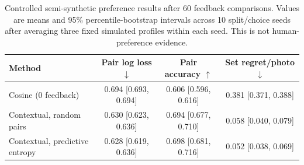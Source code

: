 \begin{table}[t]
\centering
\small
\caption{Controlled semi-synthetic preference results after 60 feedback comparisons. Values are means and 95\% percentile-bootstrap intervals across 10 split/choice seeds after averaging three fixed simulated profiles within each seed. This is not human-preference evidence.}
\label{tab:controlled-contextual-preference}
\begin{tabular}{lccc}
\toprule
Method & Pair log loss $\downarrow$ & Pair accuracy $\uparrow$ & Set regret/photo $\downarrow$ \\
\midrule
Cosine (0 feedback) & 0.694 [0.693, 0.694] & 0.606 [0.596, 0.616] & 0.381 [0.371, 0.388] \\
Contextual, random pairs & 0.630 [0.623, 0.636] & 0.694 [0.677, 0.710] & 0.058 [0.040, 0.079] \\
Contextual, predictive entropy & 0.628 [0.619, 0.636] & 0.698 [0.681, 0.716] & 0.052 [0.038, 0.069] \\
\bottomrule
\end{tabular}
\end{table}
